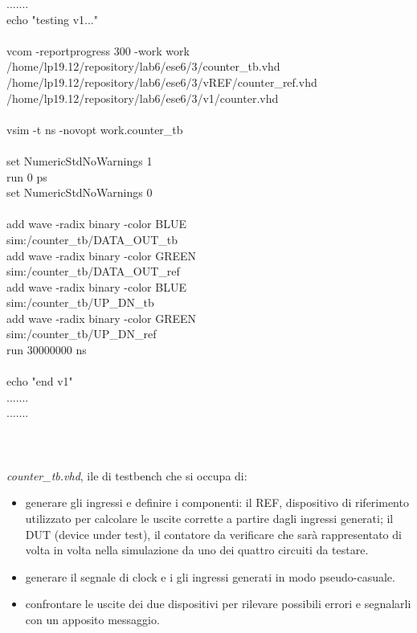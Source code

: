 .......\\
echo "testing v1..."\\
\\
vcom -reportprogress 300 -work work\\ /home/lp19.12/repository/lab6/ese6/3/counter\_tb.vhd\\ /home/lp19.12/repository/lab6/ese6/3/vREF/counter\_ref.vhd\\ /home/lp19.12/repository/lab6/ese6/3/v1/counter.vhd\\
\\
vsim -t ns -novopt work.counter\_tb\\
\\
set NumericStdNoWarnings 1\\
run 0 ps\\
set NumericStdNoWarnings 0\\
\\
add wave -radix binary   -color BLUE\\      sim:/counter\_tb/DATA\_OUT\_tb\\
add wave -radix binary   -color GREEN\\    sim:/counter\_tb/DATA\_OUT\_ref\\
add wave -radix binary   -color BLUE\\     sim:/counter\_tb/UP\_DN\_tb\\
add wave -radix binary   -color GREEN \\   sim:/counter\_tb/UP\_DN\_ref\\
run 30000000 ns\\
\\
echo "end v1"\\
.......\\
.......\\
\\
\\
\\
\textit{counter\_tb.vhd}, ile di testbench che si occupa di:
\begin{itemize}
	\item {generare gli ingressi e definire i componenti: il REF, dispositivo di riferimento utilizzato per calcolare le uscite corrette a partire dagli ingressi generati; il DUT (device under test), il contatore da verificare che sarà rappresentato di volta in volta nella simulazione da uno dei quattro circuiti da testare.}
	\item {generare il segnale di clock e i gli ingressi generati in modo pseudo-casuale.}
	\item {confrontare le uscite dei due dispositivi per rilevare possibili errori e segnalarli con un apposito messaggio.}
\end{itemize}
